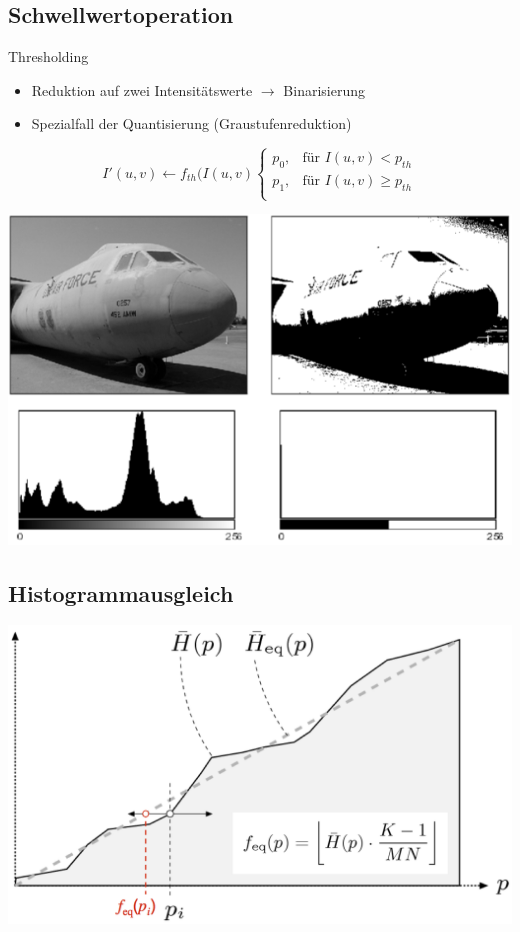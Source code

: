 \documentclass[10pt]{article}
\begin{document}
\subsection{Schwellwertoperation}
Thresholding
\begin{itemize}
	\item Reduktion auf zwei Intensitätswerte $\rightarrow$ Binarisierung
	\item Spezialfall der Quantisierung (Graustufenreduktion)
\end{itemize}
\begin{equation*}
	I'(u,v) \leftarrow f_{th}(I(u,v)\begin{cases}
  p_0,  & \text{für } I(u,v) < p_{th}\\
  p_1, & \text{für } I(u,v) \geq p_{th}\\
\end{cases}
\end{equation*}
\begin{center}
	\includegraphics[scale=0.3]{schwellwertoperation.png}
\end{center}

\subsection{Histogrammausgleich}
\begin{center}
	\includegraphics[scale=0.2]{histogrammausgleich.png}
\end{center}
\end{document}
